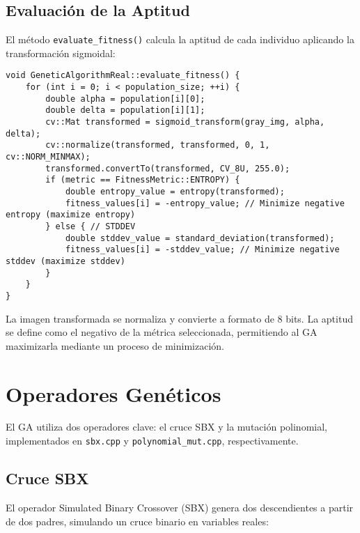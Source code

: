 \subsection{Evaluación de la Aptitud}
\label{subsec:evaluacion_aptitud}

El método \texttt{evaluate\_fitness()} calcula la aptitud de cada individuo aplicando la transformación sigmoidal:

\begin{lstlisting}[style=cppstyle, caption={Evaluación de la aptitud}, label={lst:eval_fitness}]
void GeneticAlgorithmReal::evaluate_fitness() {
    for (int i = 0; i < population_size; ++i) {
        double alpha = population[i][0];
        double delta = population[i][1];
        cv::Mat transformed = sigmoid_transform(gray_img, alpha, delta);
        cv::normalize(transformed, transformed, 0, 1, cv::NORM_MINMAX);
        transformed.convertTo(transformed, CV_8U, 255.0);
        if (metric == FitnessMetric::ENTROPY) {
            double entropy_value = entropy(transformed);
            fitness_values[i] = -entropy_value; // Minimize negative entropy (maximize entropy)
        } else { // STDDEV
            double stddev_value = standard_deviation(transformed);
            fitness_values[i] = -stddev_value; // Minimize negative stddev (maximize stddev)
        }
    }
}
\end{lstlisting}

La imagen transformada se normaliza y convierte a formato de 8 bits. La aptitud se define como el negativo de la métrica seleccionada, permitiendo al GA maximizarla mediante un proceso de minimización.

\section{Operadores Genéticos}
\label{sec:operadores}

El GA utiliza dos operadores clave: el cruce SBX y la mutación polinomial, implementados en \texttt{sbx.cpp} y \texttt{polynomial\_mut.cpp}, respectivamente.

\subsection{Cruce SBX}
\label{subsec:cruce_sbx}

El operador Simulated Binary Crossover (SBX) genera dos descendientes a partir de dos padres, simulando un cruce binario en variables reales:

